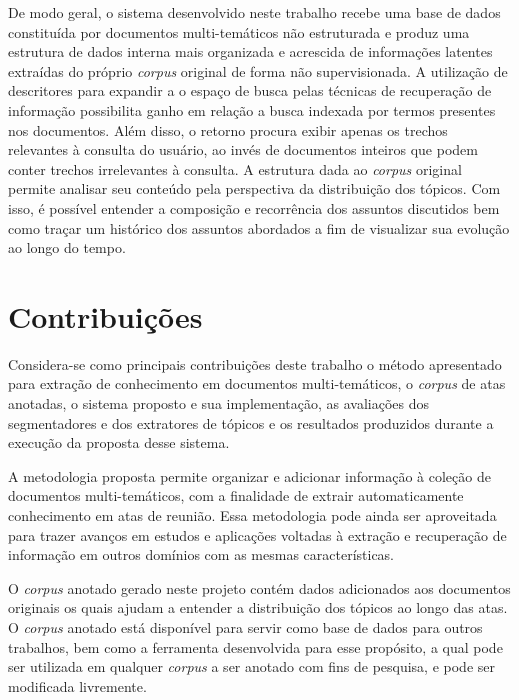 

De modo geral, o sistema desenvolvido neste trabalho recebe uma base de dados constituída por documentos multi-temáticos não estruturada e produz uma estrutura de dados interna mais organizada e acrescida de informações latentes extraídas do próprio \textit{corpus} original de forma não supervisionada. 
A utilização de descritores para expandir a o espaço de busca pelas técnicas de recuperação de informação possibilita ganho em relação a busca indexada por termos presentes nos documentos. Além disso, o retorno procura exibir apenas os trechos relevantes à consulta do usuário, ao invés de documentos inteiros que podem conter trechos irrelevantes à consulta.  
A estrutura dada ao \textit{corpus} original permite analisar seu conteúdo pela perspectiva da distribuição dos tópicos. Com isso, é possível entender a composição e recorrência dos assuntos discutidos bem como traçar um histórico dos assuntos abordados a fim de visualizar sua evolução ao longo do tempo.


\section{Contribuições}	



Considera-se como principais contribuições deste trabalho o método apresentado para extração de conhecimento em documentos multi-temáticos, o \textit{corpus} de atas anotadas, o sistema proposto e sua implementação, as avaliações dos segmentadores e dos extratores de tópicos e os resultados produzidos durante a execução da proposta desse sistema. 

A metodologia proposta permite organizar e adicionar informação à coleção de documentos multi-temáticos, com a finalidade de extrair automaticamente conhecimento em atas de reunião. Essa metodologia pode ainda ser  aproveitada para trazer avanços em estudos e aplicações voltadas à extração e recuperação de informação em outros domínios com as mesmas características. 

O \textit{corpus} anotado gerado neste projeto contém dados adicionados aos documentos originais os quais ajudam a entender a distribuição dos tópicos ao longo das atas. O \textit{corpus} anotado está disponível para servir como base de dados para outros trabalhos, bem como a ferramenta desenvolvida para esse propósito, a qual pode ser utilizada em qualquer \textit{corpus} a ser anotado com fins de pesquisa, e pode ser modificada livremente. 

